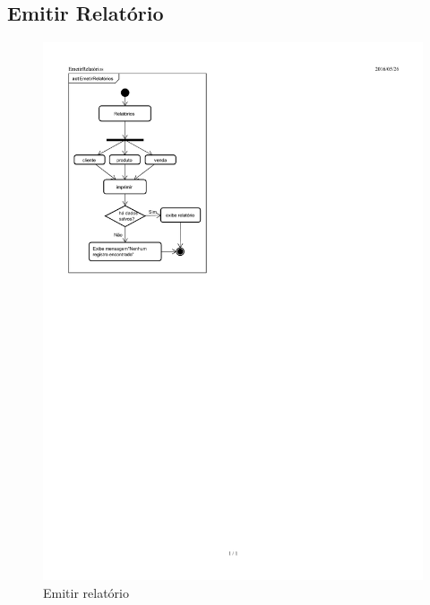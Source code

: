 \documentclass[chapter=TITLE,12pt,oneside,a4paper,english,french,sumario=tradicional,spanish,brazil,]{abntex2}
\begin{document}
\subsection{Emitir Relatório}
\begin{figure}[h]\centering
	\includegraphics[scale=1.8]{emitir-relatorio.pdf}\caption{Emitir relatório}
\end{figure}


\newpage
\end{document}
